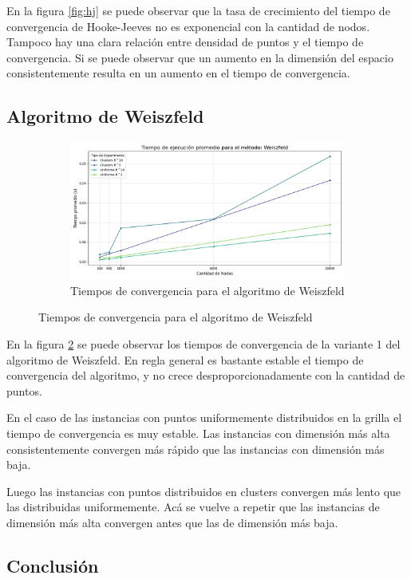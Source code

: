 \documentclass[10pt]{article}
\begin{document}
En la figura \ref{fig:hj} se puede observar que la tasa de crecimiento del tiempo de convergencia de Hooke-Jeeves no es exponencial con la cantidad de nodos. Tampoco hay una clara relación entre densidad de puntos y el tiempo de convergencia. Si se puede observar que un aumento en la dimensión del espacio consistentemente resulta en un aumento en el tiempo de convergencia. 

\subsection{Algoritmo de Weiszfeld}

\begin{figure}[H]
\begin{subfigure}[t]{0.9\textwidth}
\centering
\includegraphics[width=\linewidth]{figuras/Weiszfeld_runtime_plot.png}
\caption{Tiempos de convergencia para el algoritmo de Weiszfeld}
	\label{fig:w}
\end{subfigure}
\end{figure}

En la figura \ref{fig:w} se puede observar los tiempos de convergencia de la variante 1 del algoritmo de Weiszfeld. En regla general es bastante estable el tiempo de convergencia del algoritmo, y no crece desproporcionadamente con la cantidad de puntos.

En el caso de las instancias con puntos uniformemente distribuidos en la grilla el tiempo de convergencia es muy estable. Las instancias con dimensión más alta consistentemente convergen más rápido que las instancias con dimensión más baja. 

Luego las instancias con puntos distribuidos en clusters convergen más lento que las distribuidas uniformemente. Acá se vuelve a repetir que las instancias de dimensión más alta convergen antes que las de dimensión más baja.

\subsection{Conclusión}
\end{document}

